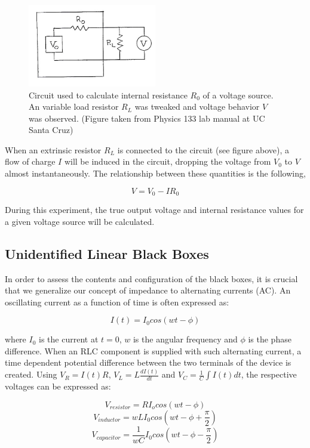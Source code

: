 \documentclass[a4paper]{article}
\begin{document}
  \begin{figure}[h]
\centering
\includegraphics[width=0.5\textwidth]{voltagesource}
\caption{Circuit used to calculate internal resistance $R_0$ of a voltage source. An variable load resistor $R_L$ was tweaked and voltage behavior $V$ was observed. (Figure taken from Physics 133 lab manual at UC Santa Cruz)}
\end{figure}

When an extrinsic resistor $R_L$ is connected to the circuit (see figure above), a flow of charge $I$ will be induced in the circuit, dropping the voltage from $V_0$ to $V$ almost instantaneously. The relationship between these quantities is the following,

\begin{equation}
V=V_0-IR_0
\end{equation}

During this experiment, the true output voltage and internal resistance values for a given voltage source will be calculated. 

\subsection{Unidentified Linear Black Boxes}

In order to assess the contents and configuration of the black boxes, it is crucial that we generalize our concept of impedance to alternating currents (AC). An oscillating current as a function of time is often expressed as:

\begin{equation}
I(t)=I_0 cos(wt-\phi)
\end{equation}

where $I_0$ is the current at $t=0$, $w$ is the angular frequency and $\phi$ is the phase difference. When an RLC component is supplied with such alternating current, a time dependent potential difference between the two terminals of the device is created. Using $V_R=I(t)R$, $V_L=L\frac{dI(t)}{dt}$ and $V_C=\frac{1}{C}\int I(t)dt$, the respective voltages can be expressed as:
\clearpage
\begin{figure}[h]
\[ V_{resistor}=RI_ocos(wt-\phi)\] 
\[V_{inductor}=wLI_0cos(wt-\phi + \frac{\pi}{2})\]
\[V_{capacitor}=\frac{1}{wC}I_0cos(wt-\phi - \frac{\pi}{2})\]
\end{figure}
\end{document}
